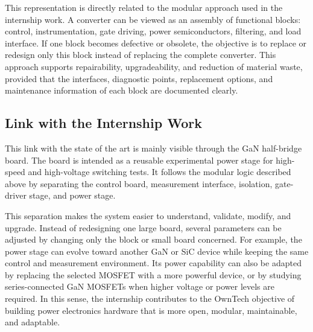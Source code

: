This representation is directly related to the modular approach used in the
internship work. A converter can be viewed as an assembly of functional blocks:
control, instrumentation, gate driving, power semiconductors, filtering, and
load interface. If one block becomes defective or obsolete, the objective is to
replace or redesign only this block instead of replacing the complete converter.
This approach supports repairability, upgradeability, and reduction of material
waste, provided that the interfaces, diagnostic points, replacement options, and
maintenance information of each block are documented clearly.

\subsection{Link with the Internship Work}
\label{subsec:internship_positioning_sustainability}

This link with the state of the art is mainly visible through the GaN
half-bridge board. The board is intended as a reusable experimental power stage
for high-speed and high-voltage switching tests. It follows the modular logic
described above by separating the control board, measurement interface,
isolation, gate-driver stage, and power stage.

This separation makes the system easier to understand, validate, modify, and
upgrade. Instead of redesigning one large board, several parameters can be
adjusted by changing only the block or small board concerned. For example, the
power stage can evolve toward another GaN or SiC device while keeping the same
control and measurement environment. Its power capability can also be adapted by
replacing the selected MOSFET with a more powerful device, or by studying
series-connected GaN MOSFETs when higher voltage or power levels are required.
In this sense, the internship contributes to the OwnTech objective of building
power electronics hardware that is more open, modular, maintainable, and
adaptable.
